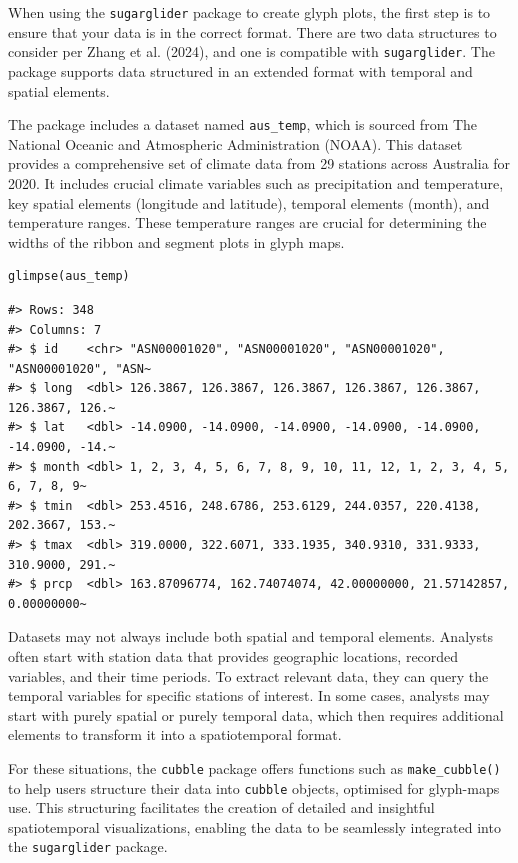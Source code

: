 When using the \texttt{sugarglider} package to create glyph plots, the first step is to ensure that your data is in the correct format. There are two data structures to consider per Zhang et al. (2024), and one is compatible with \texttt{sugarglider}. The package supports data structured in an extended format with temporal and spatial elements.

The package includes a dataset named \texttt{aus\_temp}, which is sourced from The National Oceanic and Atmospheric Administration (NOAA). This dataset provides a comprehensive set of climate data from 29 stations across Australia for 2020. It includes crucial climate variables such as precipitation and temperature, key spatial elements (longitude and latitude), temporal elements (month), and temperature ranges. These temperature ranges are crucial for determining the widths of the ribbon and segment plots in glyph maps.

\begin{verbatim}
glimpse(aus_temp)
\end{verbatim}

\begin{verbatim}
#> Rows: 348
#> Columns: 7
#> $ id    <chr> "ASN00001020", "ASN00001020", "ASN00001020", "ASN00001020", "ASN~
#> $ long  <dbl> 126.3867, 126.3867, 126.3867, 126.3867, 126.3867, 126.3867, 126.~
#> $ lat   <dbl> -14.0900, -14.0900, -14.0900, -14.0900, -14.0900, -14.0900, -14.~
#> $ month <dbl> 1, 2, 3, 4, 5, 6, 7, 8, 9, 10, 11, 12, 1, 2, 3, 4, 5, 6, 7, 8, 9~
#> $ tmin  <dbl> 253.4516, 248.6786, 253.6129, 244.0357, 220.4138, 202.3667, 153.~
#> $ tmax  <dbl> 319.0000, 322.6071, 333.1935, 340.9310, 331.9333, 310.9000, 291.~
#> $ prcp  <dbl> 163.87096774, 162.74074074, 42.00000000, 21.57142857, 0.00000000~
\end{verbatim}

Datasets may not always include both spatial and temporal elements. Analysts often start with station data that provides geographic locations, recorded variables, and their time periods. To extract relevant data, they can query the temporal variables for specific stations of interest. In some cases, analysts may start with purely spatial or purely temporal data, which then requires additional elements to transform it into a spatiotemporal format.

For these situations, the \texttt{cubble} package offers functions such as \texttt{make\_cubble()} to help users structure their data into \texttt{cubble} objects, optimised for glyph-maps use. This structuring facilitates the creation of detailed and insightful spatiotemporal visualizations, enabling the data to be seamlessly integrated into the \texttt{sugarglider} package.


